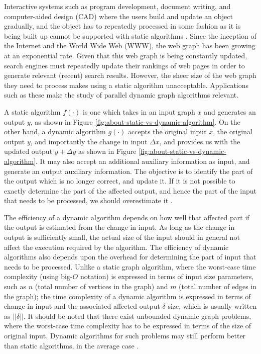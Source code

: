 Interactive systems such as program development, document writing, and computer-aided design (CAD) where the users build and update an object gradually, and the object has to repeatedly processed in some fashion as it is being built up cannot be supported with static algorithms \cite{incr-ramalingam96}. Since the inception of the Internet and the World Wide Web (WWW), the web graph has been growing at an exponential rate. Given that this web graph is being constantly updated, search engines must repeatedly update their rankings of web pages in order to generate relevant (recent) search results. However, the sheer size of the web graph they need to process makes using a static algorithm unacceptable. Applications such as these make the study of parallel dynamic graph algorithms relevant.

A static algorithm $f(\cdot)$ is one which takes in an input graph $x$ and generates an output $y$, as shown in Figure \ref{fig:about-static-vs-dynamic-algorithm}. On the other hand, a dynamic algorithm $g(\cdot)$ accepts the original input $x$, the original output $y$, and importantly the change in input $\Delta x$, and provides us with the updated output $y + \Delta y$ as shown in Figure \ref{fig:about-static-vs-dynamic-algorithm}. It may also accept an additional auxiliary information as input, and generate an output auxiliary information. The objective is to identify the part of the output which is no longer correct, and update it. If it is not possible to exactly determine the part of the affected output, and hence the part of the input that needs to be processed, we should overestimate it \cite{incr-ramalingam96}.

The efficiency of a dynamic algorithm depends on how well that affected part if the output is estimated from the change in input. As long as the change in output is sufficiently small, the actual size of the input should in general not affect the execution required by the algorithm. The efficiency of dynamic algorithms also depends upon the overhead for determining the part of input that needs to be processed. Unlike a static graph algorithm, where the worst-case time complexity (using big-$O$ notation) is expressed in terms of input size parameters, such as $n$ (total number of vertices in the graph) and $m$ (total number of edges in the graph); the time complexity of a dynamic algorithm is expressed in terms of change in input and the associated affected output $\delta$ size, which is usually written as $||\delta||$. It should be noted that there exist unbounded dynamic graph problems, where the worst-case time complexity has to be expressed in terms of the size of original input. Dynamic algorithms for such problems may still perform better than static algorithms, in the average case \cite{incr-ramalingam96}.

